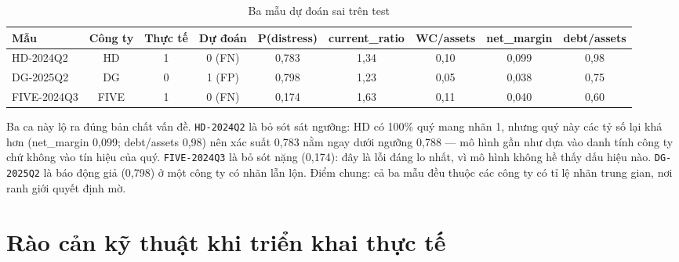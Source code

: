 \documentclass[13pt,a4paper]{extreport}
\begin{document}
\begin{table}[H]
\centering
\caption{Ba mẫu dự đoán sai trên test}
\begin{center}
\footnotesize
\begin{tabular}{|l|c|c|c|c|c|c|c|c|}
\hline
\textbf{Mẫu} & \textbf{Công ty} & \textbf{Thực tế} & \textbf{Dự đoán} & \textbf{P(distress)} & \textbf{current\_ratio} & \textbf{WC/assets} & \textbf{net\_margin} & \textbf{debt/assets} \\ \hline
HD-2024Q2 & HD & 1 & 0 (FN) & 0,783 & 1,34 & 0,10 & 0,099 & 0,98 \\ \hline
DG-2025Q2 & DG & 0 & 1 (FP) & 0,798 & 1,23 & 0,05 & 0,038 & 0,75 \\ \hline
FIVE-2024Q3 & FIVE & 1 & 0 (FN) & 0,174 & 1,63 & 0,11 & 0,040 & 0,60 \\ \hline
\end{tabular}
\end{center}
\end{table}

Ba ca này lộ ra đúng bản chất vấn đề. \texttt{HD-2024Q2} là bỏ sót sát ngưỡng: HD có 100\% quý mang nhãn 1, nhưng quý này các tỷ số lại khá hơn (net\_margin 0,099; debt/assets 0,98) nên xác suất 0,783 nằm ngay dưới ngưỡng 0,788 — mô hình gần như dựa vào danh tính công ty chứ không vào tín hiệu của quý. \texttt{FIVE-2024Q3} là bỏ sót nặng (0,174): đây là lỗi đáng lo nhất, vì mô hình không hề thấy dấu hiệu nào. \texttt{DG-2025Q2} là báo động giả (0,798) ở một công ty có nhãn lẫn lộn. Điểm chung: cả ba mẫu đều thuộc các công ty có tỉ lệ nhãn trung gian, nơi ranh giới quyết định mờ.

\section{Rào cản kỹ thuật khi triển khai thực tế}
\end{document}
